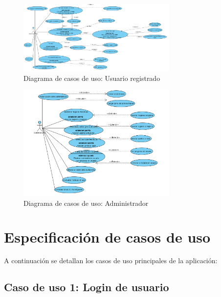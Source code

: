 \begin{figure}[H]
    \centering
    \includegraphics[width=0.7\textwidth]{figs/diagrama_usuario_registrado.png}
    \caption{Diagrama de casos de uso: Usuario registrado}
\end{figure}

\begin{figure}[H]
    \centering
    \includegraphics[width=0.7\textwidth]{figs/diagrama_administrador.png}
    \caption{Diagrama de casos de uso: Administrador}
\end{figure}

\section{Especificación de casos de uso}

A continuación se detallan los casos de uso principales de la aplicación:

\subsection{Caso de uso 1: Login de usuario}

